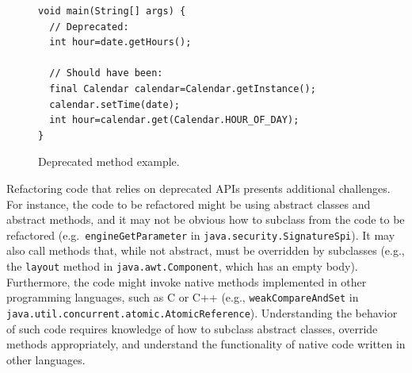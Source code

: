 \documentclass[sigconf]{acmart}
\begin{document}
\begin{figure}[ht]
\begin{lstlisting}[mathescape=true,showstringspaces=false,basicstyle=\small]
void main(String[] args) {
  // Deprecated:
  int hour=date.getHours();

  // Should have been:
  final Calendar calendar=Calendar.getInstance();
  calendar.setTime(date);
  int hour=calendar.get(Calendar.HOUR_OF_DAY);
}
\end{lstlisting}
\caption{Deprecated method example.}
\label{ex:deprecated-method-other}
\end{figure}

%



Refactoring code that relies on deprecated APIs presents additional challenges. For instance, the code to be refactored might be using abstract classes and abstract methods, and it may not be obvious how to subclass from the code to be refactored (e.g.~\lstinline[breaklines=true]{engineGetParameter} in \lstinline[breaklines=true]{java.security.SignatureSpi}). It may also call methods that, while not abstract, must be overridden by subclasses (e.g., the \lstinline[breaklines=true]{layout} method in \lstinline[breaklines=true]{java.awt.Component}, which has an empty body). Furthermore, the code might invoke native methods implemented in other programming languages, such as C or C++ (e.g., \lstinline[breaklines=true]{weakCompareAndSet} in \lstinline[breaklines=true]{java.util.concurrent.atomic.AtomicReference}). Understanding the behavior of such code requires knowledge of how to subclass abstract classes, override methods appropriately, and understand the functionality of native code written in other languages.
\end{document}
